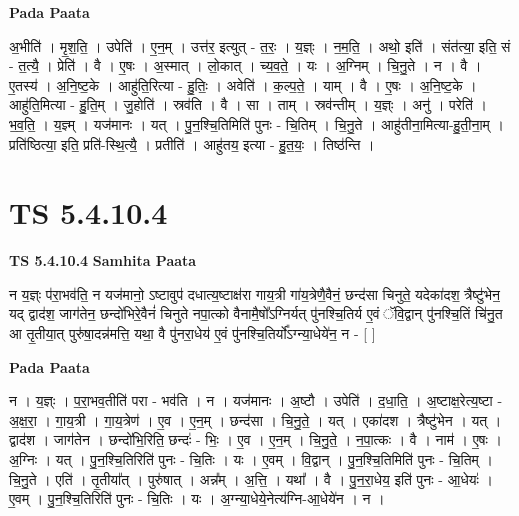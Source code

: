 \documentclass[17pt]{extarticle}
\begin{document}
\textbf{Pada Paata} \newline

अ॒भीति॑ । मृ॒श॒ति॒ । उपेति॑ । ए॒न॒म् । उत्त॑र॒ इत्युत् - त॒रः॒ । य॒ज्ञ्ः । न॒म॒ति॒ । अथो॒ इति॑ । संत॑त्या॒ इति॒ सं - त॒त्यै॒ । प्रेति॑ । वै । ए॒षः । अ॒स्मात् । लो॒कात् । च्य॒व॒ते॒ । यः । अ॒ग्निम् । चि॒नु॒ते । न । वै । ए॒तस्य॑ । अ॒नि॒ष्ट॒के । आहु॑ति॒रित्या - हु॒तिः॒ । अवेति॑ । क॒ल्प॒ते॒ । याम् । वै । ए॒षः । अ॒नि॒ष्ट॒के । आहु॑ति॒मित्या - हु॒ति॒म् । जु॒होति॑ । स्रव॑ति । वै । सा । ताम् । स्रव॑न्तीम् । य॒ज्ञ्ः । अनु॑ । परेति॑ । भ॒व॒ति॒ । य॒ज्ञ्म् । यज॑मानः । यत् । पु॒न॒श्चि॒तिमिति॑ पुनः - चि॒तिम् । चि॒नु॒ते । आहु॑तीना॒मित्या-हु॒ती॒ना॒म् । प्रति॑ष्ठित्या॒ इति॒ प्रति॑-स्थि॒त्यै॒ । प्रतीति॑ । आहु॑तय॒ इत्या - हु॒त॒यः॒ । तिष्ठ॑न्ति ।  \newline





\section{ TS 5.4.10.4 }

\textbf{TS 5.4.10.4 } \newline
\textbf{Samhita Paata} \newline

न य॒ज्ञ्ः प॑रा॒भव॑ति॒ न यज॑मानो॒ ऽष्टावुप॑ दधात्य॒ष्टाक्ष॑रा गाय॒त्री गा॑य॒त्रेणै॒वैनं॒ छन्द॑सा चिनुते॒ यदेका॑दश॒ त्रैष्टु॑भेन॒ यद् द्वाद॑श॒ जाग॑तेन॒ छन्दो॑भिरे॒वैनं॑ चिनुते नपा॒त्को वैनामै॒षो᳚ऽग्निर्यत् पु॑नश्चि॒तिर्य ए॒वं ॅवि॒द्वान् पु॑नश्चि॒तिं चि॑नु॒त आ तृ॒तीया॒त् पुरु॑षा॒दन्न॑मत्ति॒ यथा॒ वै पु॑नरा॒धेय॑ ए॒वं पु॑नश्चि॒तिर्यो᳚ऽग्न्या॒धेये॑न॒ न - [  ] \newline

\textbf{Pada Paata} \newline

न । य॒ज्ञ्ः । प॒रा॒भव॒तीति॑ परा - भव॑ति । न । यज॑मानः । अ॒ष्टौ । उपेति॑ । द॒धा॒ति॒ । अ॒ष्टाक्ष॒रेत्य॒ष्टा - अ॒क्ष॒रा॒ । गा॒य॒त्री । गा॒य॒त्रेण॑ । ए॒व । ए॒न॒म् । छन्द॑सा । चि॒नु॒ते॒ । यत् । एका॑दश । त्रैष्टु॑भेन । यत् । द्वाद॑श । जाग॑तेन । छन्दो॑भि॒रिति॒ छन्दः॑ - भिः॒ । ए॒व । ए॒न॒म् । चि॒नु॒ते॒ । न॒पा॒त्कः । वै । नाम॑ । ए॒षः । अ॒ग्निः । यत् । पु॒न॒श्चि॒तिरिति॑ पुनः - चि॒तिः । यः । ए॒वम् । वि॒द्वान् । पु॒न॒श्चि॒तिमिति॑ पुनः - चि॒तिम् । चि॒नु॒ते । एति॑ । तृ॒तीया᳚त् । पुरु॑षात् । अन्न᳚म् । अ॒त्ति॒ । यथा᳚ । वै । पु॒न॒रा॒धेय॒ इति॑ पुनः - आ॒धेयः॑ । ए॒वम् । पु॒न॒श्चि॒तिरिति॑ पुनः - चि॒तिः । यः । अ॒ग्न्या॒धेये॒नेत्य॑ग्नि-आ॒धेये॑न । न ।  \newline
\end{document}

